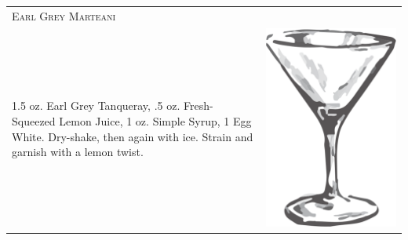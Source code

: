 \documentclass{article}
\begin{document}
\begin{tabular}{p{2in} p{0.5in}}
	\multicolumn{2}{p{3in}}{\centering\Huge\textsc{Earl Grey Marteani}}\\ 
	  \vspace{-0.1in}1.5 oz. Earl Grey Tanqueray, .5 oz. Fresh-Squeezed Lemon Juice, 1 oz. Simple Syrup, 1 Egg White. Dry-shake, then again with ice. Strain and garnish with a lemon twist. &
	  \vspace{-0.1in} \includegraphics{goblet.png}
\end{tabular}\\
\end{document}
